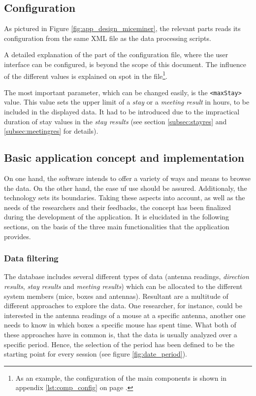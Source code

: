 \subsection{Configuration}
\label{subsec:miceminer_config}

As pictured in Figure \ref{fig:app_design_miceminer}, the relevant parts reads its configuration from the same XML file as the data processing scripts. 

A detailed explanation of the  part of the configuration file, where the user interface can be configured, is beyond the scope of this document. The influence of the different values is explained on spot in the file\footnote{As an example, the configuration of the main components is shown in appendix \ref{lst:comp_config} on page \pageref{lst:comp_config}.}.

The most important parameter, which can be changed easily, is the \lstinline|<maxStay>| value. This value sets the upper limit of a \textit{stay} or a \textit{meeting result} in hours, to be included in the displayed data. It had to be introduced due to the impractical duration of stay values in the \textit{stay results} (see section \ref{subsec:stayres} and \ref{subsec:meetingres} for details).

\subsection{Basic application concept and implementation}
\label{subsec:app_concept}

On one hand, the software intends to offer a variety of ways and means to browse the data. On the other hand, the ease uf use should be assured. Additionaly, the technology sets its boundaries. Taking these aspects into account, as well as the needs of the researchers and their feedbacks, the concept has been finalized during the development of the application. It is elucidated in the following sections, on the basis of the three main functionalities that the application provides. 
   
\subsubsection{Data filtering}
\label{sububsec:datafilter}

The database includes several different types of data (antenna readings, \textit{direction results}, \textit{stay results} and \textit{meeting results}) which can be allocated to the different system members (mice, boxes and antennas). Resultant are a multitude of different approaches to explore the data. One researcher, for instance, could be interested in the antenna readings of a mouse at a specific antenna, another one needs to know in which boxes a specific mouse has spent time. What both of these approaches have in common is, that the data is usually analyzed over a specific period. Hence, the selection of the period has been defined to be the starting point for every session (see figure \ref{fig:date_period}).

